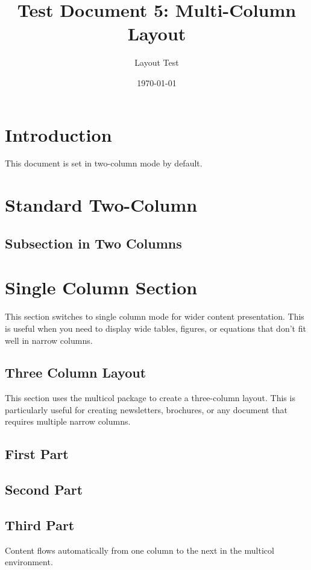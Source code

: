 \documentclass[10pt,twocolumn]{article}
\title{Test Document 5: Multi-Column Layout}
\author{Layout Test}
\date{\today}
\begin{document}

\section{Introduction}
This document is set in two-column mode by default. \lipsum[1]

\section{Standard Two-Column}
\lipsum[2]

\subsection{Subsection in Two Columns}
\lipsum[3]

\onecolumn
\section{Single Column Section}
This section switches to single column mode for wider content presentation. This is useful when you need to display wide tables, figures, or equations that don't fit well in narrow columns.

\lipsum[4]

\begin{multicols}{3}
\section{Three Column Layout}
This section uses the multicol package to create a three-column layout. This is particularly useful for creating newsletters, brochures, or any document that requires multiple narrow columns.

\subsection{First Part}
\lipsum[5]

\subsection{Second Part}
\lipsum[6]

\subsection{Third Part}
Content flows automatically from one column to the next in the multicol environment.
\end{multicols}
\end{document}
